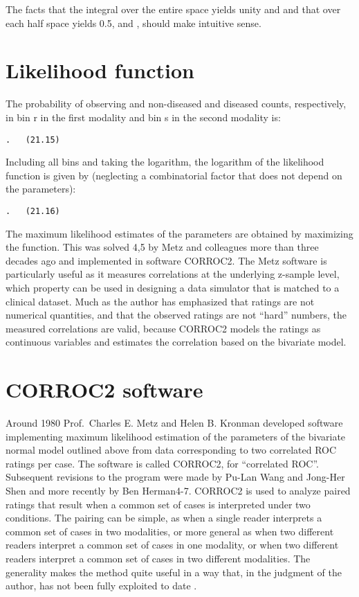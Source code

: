 \documentclass[
]{book}
\begin{document}
The facts that the integral over the entire space yields unity and and that over each half space yields 0.5, and , should make intuitive sense.

\hypertarget{bivariate-binormal-model-likelihood}{%
\section{Likelihood function}\label{bivariate-binormal-model-likelihood}}

The probability of observing and non-diseased and diseased counts, respectively, in bin r in the first modality and bin s in the second modality is:

\begin{verbatim}
.   (21.15)
\end{verbatim}

Including all bins and taking the logarithm, the logarithm of the likelihood function is given by (neglecting a combinatorial factor that does not depend on the parameters):

\begin{verbatim}
.   (21.16)
\end{verbatim}

The maximum likelihood estimates of the parameters are obtained by maximizing the function. This was solved 4,5 by Metz and colleagues more than three decades ago and implemented in software CORROC2. The Metz software is particularly useful as it measures correlations at the underlying z-sample level, which property can be used in designing a data simulator that is matched to a clinical dataset. Much as the author has emphasized that ratings are not numerical quantities, and that the observed ratings are not ``hard'' numbers, the measured correlations are valid, because CORROC2 models the ratings as continuous variables and estimates the correlation based on the bivariate model.

\hypertarget{bivariate-binormal-model-corroc2}{%
\section{CORROC2 software}\label{bivariate-binormal-model-corroc2}}

Around 1980 Prof.~Charles E. Metz and Helen B. Kronman developed software implementing maximum likelihood estimation of the parameters of the bivariate normal model outlined above from data corresponding to two correlated ROC ratings per case. The software is called CORROC2, for ``correlated ROC''. Subsequent revisions to the program were made by Pu-Lan Wang and Jong-Her Shen and more recently by Ben Herman4-7. CORROC2 is used to analyze paired ratings that result when a common set of cases is interpreted under two conditions. The pairing can be simple, as when a single reader interprets a common set of cases in two modalities, or more general as when two different readers interpret a common set of cases in one modality, or when two different readers interpret a common set of cases in two different modalities. The generality makes the method quite useful in a way that, in the judgment of the author, has not been fully exploited to date .
\end{document}
